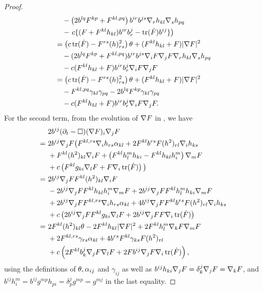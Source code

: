 \documentclass{amsart}
\begin{document}
\begin{proof}
\begin{equation}
\begin{split}
& \quad - \left(2b^{lq}F^{kp} + F^{kl,pq}\right) b^{ir}b^{js} \nabla_r h_{kl} \nabla_s h_{pq} \\
& \quad - \left. c \{(F + F^{kl}h_{kl}) b^{ir}b^{j}_{r} - \operatorname{tr}(\dot{F}) b^{ij}\}\right) \\
&= \left(c\operatorname{tr}(\dot{F}) - F^{rs}(h)^2_{rs}\right) \theta+ (F^{kl}h_{kl} + F)|\nabla F|^{2}\\ & \quad - (2b^{lq}F^{kp} + F^{kl,pq}) b^{ir}b^{js}\nabla_iF\nabla_jF\nabla_rh_{kl}\nabla_s h_{pq} \\
&\quad  - c(F^{kl}h_{kl} + F)b^{ir}b^{j}_{r}\nabla_i F\nabla_jF \\
&= \left(c\operatorname{tr}(\dot{F}) - F^{rs}(h)^2_{rs}\right) \theta  + (F^{kl}h_{kl} + F)|\nabla F|^{2} \\
&\quad - F^{kl,pq} \gamma_{kl} \gamma_{pq} - 2b^{lq}F^{kp} \gamma_{kl} \gamma_{pq}  \\
&\quad -c(F^{kl}h_{kl} + F)b^{ir}b^{j}_{r}\nabla_i F\nabla_jF.
\end{split}
\end{equation}
For the second term, from the evolution of \(\nabla F\) in , we have
\begin{equation}
\label{eq:delt_theta2}
\begin{split}
&2 b^{ij} (\partial_{t} - \Box) (\nabla F)_i \nabla_jF\\
=\ &2 b^{ij} \nabla_jF \big(F^{kl,rs}\nabla_i h_{rs} \alpha_{kl} + 2 F^{kl} b^{rs} F(h^2)_{rl} \nabla_i h_{ks}  \\
\quad &+ F^{kl}(h^2)_{kl}\nabla_i F + \left(F^{kl}h^{m}_{l}h_{ki} - F^{kl}h_{kl}h^{m}_{i}\right) \nabla_m F\\
\quad &+ c\left(F^{kl}g_{ki} \nabla_l F + F \nabla_i \operatorname{tr}(\dot{F})\right)\big) \\
=\ &2 b^{ij} \nabla_jF F^{kl}(h^2)_{kl}\nabla_i F \\
\quad &- 2 b^{ij} \nabla_jF F^{kl}h_{kl}h^{m}_{i} \nabla_m F + 2 b^{ij} \nabla_jF F^{kl}h^{m}_{l}h_{ki} \nabla_m F \\
\quad &+ 2 b^{ij} \nabla_jF F^{kl,rs}\nabla_i h_{rs} \alpha_{kl}  + 4 b^{ij} \nabla_jF F^{kl} b^{rs} F(h^2)_{rl} \nabla_i h_{ks} \\
\quad &+ c\left(2 b^{ij} \nabla_jF F^{kl}g_{ki} \nabla_l F + 2 b^{ij} \nabla_jF F \nabla_i \operatorname{tr}(\dot{F})\right) \\
=\ &2 F^{kl}(h^2)_{kl}\theta - 2 F^{kl}h_{kl} |\nabla F|^2 + 2 F^{kl} h^{m}_{l} \nabla_kF \nabla_m F \\
\quad &+ 2 F^{kl,rs} \gamma_{rs} \alpha_{kl} + 4 b^{rs} F^{kl} \gamma_{ks} F(h^2)_{rl} \\
\quad &+ c\left(2 F^{kl} b^j_k \nabla_jF \nabla_l F + 2 F b^{ij} \nabla_jF \nabla_i \operatorname{tr}(\dot{F})\right),
\end{split}
\end{equation}
using the definitions of \(\theta, \alpha_{ij}\) and \(\gamma_{ij}\) as well as \(b^{ij}h_{ki} \nabla_j F = \delta^j_k \nabla_j F = \nabla_k F\), and \(b^{ij} h^m_i = b^{ij} g^{mp}h_{pi} = \delta^j_p g^{mp} = g^{mj}\) in the last equality.


\end{proof}
\end{document}
